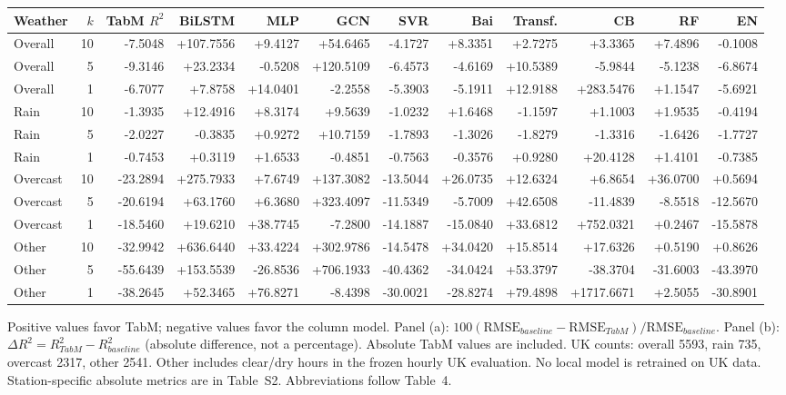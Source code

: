 \begin{table}[!htbp]
{\begin{tabular}{lrrrrrrrrrrr}
\toprule
Weather & $k$ & TabM $R^2$ & BiLSTM & MLP & GCN & SVR & Bai & Transf. & CB & RF & EN \\
\midrule
Overall & 10 & -7.5048 & +107.7556 & +9.4127 & +54.6465 & -4.1727 & +8.3351 & +2.7275 & +3.3365 & +7.4896 & -0.1008 \\
Overall & 5 & -9.3146 & +23.2334 & -0.5208 & +120.5109 & -6.4573 & -4.6169 & +10.5389 & -5.9844 & -5.1238 & -6.8674 \\
Overall & 1 & -6.7077 & +7.8758 & +14.0401 & -2.2558 & -5.3903 & -5.1911 & +12.9188 & +283.5476 & +1.1547 & -5.6921 \\
Rain & 10 & -1.3935 & +12.4916 & +8.3174 & +9.5639 & -1.0232 & +1.6468 & -1.1597 & +1.1003 & +1.9535 & -0.4194 \\
Rain & 5 & -2.0227 & -0.3835 & +0.9272 & +10.7159 & -1.7893 & -1.3026 & -1.8279 & -1.3316 & -1.6426 & -1.7727 \\
Rain & 1 & -0.7453 & +0.3119 & +1.6533 & -0.4851 & -0.7563 & -0.3576 & +0.9280 & +20.4128 & +1.4101 & -0.7385 \\
Overcast & 10 & -23.2894 & +275.7933 & +7.6749 & +137.3082 & -13.5044 & +26.0735 & +12.6324 & +6.8654 & +36.0700 & +0.5694 \\
Overcast & 5 & -20.6194 & +63.1760 & +6.3680 & +323.4097 & -11.5349 & -5.7009 & +42.6508 & -11.4839 & -8.5518 & -12.5670 \\
Overcast & 1 & -18.5460 & +19.6210 & +38.7745 & -7.2800 & -14.1887 & -15.0840 & +33.6812 & +752.0321 & +0.2467 & -15.5878 \\
Other & 10 & -32.9942 & +636.6440 & +33.4224 & +302.9786 & -14.5478 & +34.0420 & +15.8514 & +17.6326 & +0.5190 & +0.8626 \\
Other & 5 & -55.6439 & +153.5539 & -26.8536 & +706.1933 & -40.4362 & -34.0424 & +53.3797 & -38.3704 & -31.6003 & -43.3970 \\
Other & 1 & -38.2645 & +52.3465 & +76.8271 & -8.4398 & -30.0021 & -28.8274 & +79.4898 & +1717.6671 & +2.5055 & -30.8901 \\
\bottomrule
\end{tabular}
}
\par\smallskip
\begin{minipage}{\textwidth}\footnotesize Positive values favor TabM; negative values favor the column model. Panel (a): $100(\mathrm{RMSE}_{baseline}-\mathrm{RMSE}_{TabM})/\mathrm{RMSE}_{baseline}$. Panel (b): $\Delta R^2=R^2_{TabM}-R^2_{baseline}$ (absolute difference, not a percentage). Absolute TabM values are included.  UK counts: overall 5593, rain 735, overcast 2317, other 2541. Other includes clear/dry hours in the frozen hourly UK evaluation. No local model is retrained on UK data. Station-specific absolute metrics are in Table~S2. Abbreviations follow Table~4.\end{minipage}
\end{table}
\endgroup
